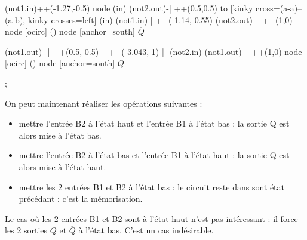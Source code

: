 \documentclass{../template/labo}
\begin{document}
\begin{info}
\begin{center}
\begin{circuitikz}
		(not1.in)++(-1.27,-0.5) node (in) {} %
		(not2.out)-| ++(0.5,0.5) to  [kinky cross=(a-a)--(a-b), kinky crosses=left] (in)
		(not1.in)-| ++(-1.14,-0.55)
		(not2.out) -- ++(1,0) node [ocirc] () {} node [anchor=south] {$\overline{Q}$}

		(not1.out) -| ++(0.5,-0.5) -- ++(-3.043,-1) |- (not2.in)
		(not1.out) -- ++(1,0) node [ocirc] () {} node [anchor=south] {$Q$}

	;\end{circuitikz}
\end{center}

On peut maintenant réaliser les opérations suivantes :
\begin{itemize}
\item mettre l'entrée B2 à l'état haut et l'entrée B1 à l'état bas : la sortie Q est alors mise à l'état bas.
\item mettre l'entrée B2 à l'état bas et l'entrée B1 à l'état haut : la sortie Q est alors mise à l'état haut.
\item  mettre les 2 entrées B1 et B2 à l'état bas : le circuit reste dans sont état précédant : c'est la
mémorisation.
\end{itemize}


Le cas où les 2 entrées B1 et B2 sont à l'état haut n'est pas intéressant : il force les 2 sorties $Q$ et $\overline{Q}$ à
l'état bas. C'est un cas indésirable.
\end{info}
\end{document}
